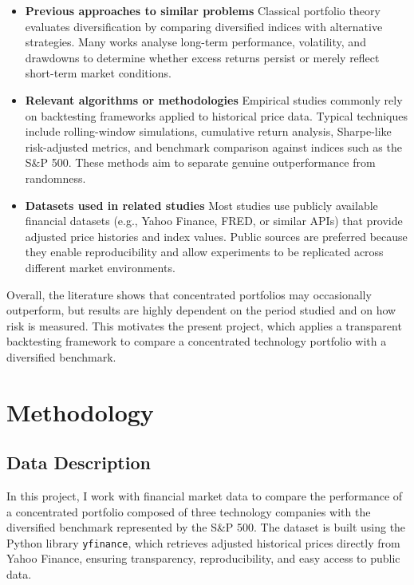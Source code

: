 \documentclass[11pt,a4paper]{article}
\begin{document}
\begin{itemize}

\item \textbf{Previous approaches to similar problems}  
Classical portfolio theory evaluates diversification by comparing diversified indices with alternative strategies. Many works analyse long-term performance, volatility, and drawdowns to determine whether excess returns persist or merely reflect short-term market conditions.

\item \textbf{Relevant algorithms or methodologies}  
Empirical studies commonly rely on backtesting frameworks applied to historical price data. Typical techniques include rolling-window simulations, cumulative return analysis, Sharpe-like risk-adjusted metrics, and benchmark comparison against indices such as the S\&P 500. These methods aim to separate genuine outperformance from randomness.

\item \textbf{Datasets used in related studies}  
Most studies use publicly available financial datasets (e.g., Yahoo Finance, FRED, or similar APIs) that provide adjusted price histories and index values. Public sources are preferred because they enable reproducibility and allow experiments to be replicated across different market environments.

\end{itemize}

Overall, the literature shows that concentrated portfolios may occasionally outperform, but results are highly dependent on the period studied and on how risk is measured. This motivates the present project, which applies a transparent backtesting framework to compare a concentrated technology portfolio with a diversified benchmark.\section{Methodology}

\label{sec:methodology}

\subsection{Data Description}

\noindent In this project, I work with financial market data to compare the performance of a concentrated portfolio composed of three technology companies with the diversified benchmark represented by the S\&P 500. The dataset is built using the Python library \texttt{yfinance}, which retrieves adjusted historical prices directly from Yahoo Finance, ensuring transparency, reproducibility, and easy access to public data.
\end{document}
